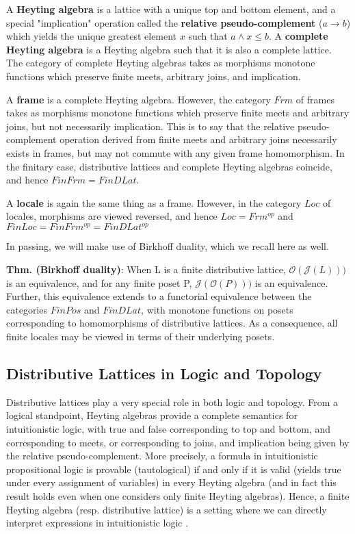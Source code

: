 \documentclass[hoptionsi,review,format=acmsmall]{acmart}
\theoremstyle{definition}
\newcommand{\Oc}{\mathcal{O}}
\newcommand{\Jc}{\mathcal{J}}
\begin{document}
A \textbf{Heyting algebra} is a lattice with a unique top and bottom element, and a special "implication" operation called the \textbf{relative pseudo-complement} (\(a \rightarrow b\)) which yields the unique greatest element \(x\) such that \(a \wedge x \le b\). A \textbf{complete Heyting algebra} is a Heyting algebra such that it is also a complete lattice. The category of complete Heyting algebras takes as morphisms monotone functions which preserve finite meets, arbitrary joins, and implication.

A \textbf{frame} is a complete Heyting algebra. However, the category \(Frm\) of frames takes as morphisms monotone functions which preserve finite meets and arbitrary joins, but not necessarily implication. This is to say that the relative pseudo-complement operation derived from finite meets and arbitrary joins necessarily exists in frames, but may not commute with any given frame homomorphism. In the finitary case, distributive lattices and complete Heyting algebras coincide, and hence \(FinFrm = FinDLat\).

A \textbf{locale} is again the same thing as a frame. However, in the category \(Loc\) of locales, morphisms are viewed reversed, and hence \(Loc = Frm^{op}\) and \(FinLoc = FinFrm^{op} = FinDLat^{op}\)

In passing, we will make use of Birkhoff duality, which we recall here as well.

\textbf{Thm. (Birkhoff duality)}: When L is a finite distributive lattice, \(\Oc(\Jc(L)))\) is an equivalence, and for any finite poset P,  \(\Jc(\Oc(P)))\) is an equivalence. Further, this equivalence extends to a functorial equivalence between the categories \(FinPos\) and \(FinDLat\), with monotone functions on posets corresponding to homomorphisms of distributive lattices. As a consequence, all finite locales may be viewed in terms of their underlying posets.

\subsection{Distributive Lattices in Logic and Topology}

Distributive lattices play a very special role in both logic and topology. From a logical standpoint, Heyting algebras provide a complete semantics for intuitionistic logic, with true and false corresponding to top and bottom, and corresponding to meets, or corresponding to joins, and implication being given by the relative pseudo-complement. More precisely, a formula in intuitionistic propositional logic is provable (tautological) if and only if it is valid (yields true under every assignment of variables) in every Heyting algebra (and in fact this result holds even when one considers only finite Heyting algebras). Hence, a finite Heyting algebra (resp. distributive lattice) is a setting where we can directly interpret expressions in intuitionistic logic \cite{van1988troelstra}.
\end{document}
